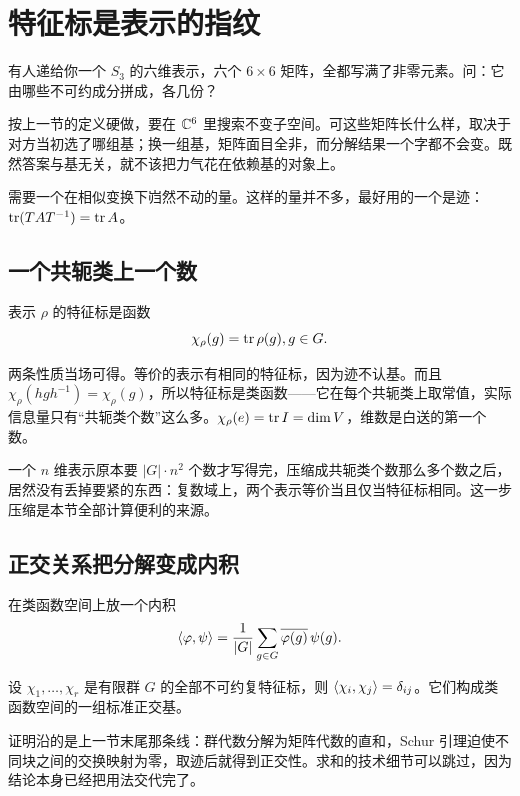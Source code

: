 \section{特征标是表示的指纹}
\label{sec:04-Discrete-Mathematics/09-Representation-Theory/03}

有人递给你一个 \(S_3\) 的六维表示，六个 \(6\times6\) 矩阵，全都写满了非零元素。问：它由哪些不可约成分拼成，各几份？

按上一节的定义硬做，要在 \(\mathbb{C}^6\) 里搜索不变子空间。可这些矩阵长什么样，取决于对方当初选了哪组基；换一组基，矩阵面目全非，而分解结果一个字都不会变。既然答案与基无关，就不该把力气花在依赖基的对象上。

需要一个在相似变换下岿然不动的量。这样的量并不多，最好用的一个是迹：\(\operatorname{tr}(TAT^{-1})=\operatorname{tr} A\)。

\subsection{一个共轭类上一个数}

\begin{definition}
表示 \(\rho\) 的特征标是函数
\[
\chi_\rho(g)=\operatorname{tr}\rho(g),\space g\in G.
\]
\end{definition}

两条性质当场可得。等价的表示有相同的特征标，因为迹不认基。而且 \(\chi_\rho(hgh^{-1})=\chi_\rho(g)\)，所以特征标是类函数——它在每个共轭类上取常值，实际信息量只有``共轭类个数''这么多。\(\chi_\rho(e)=\operatorname{tr} I=\dim V\)，维数是白送的第一个数。

一个 \(n\) 维表示原本要 \(|G|\cdot n^2\) 个数才写得完，压缩成共轭类个数那么多个数之后，居然没有丢掉要紧的东西：复数域上，两个表示等价当且仅当特征标相同。这一步压缩是本节全部计算便利的来源。

\subsection{正交关系把分解变成内积}

在类函数空间上放一个内积
\[
\left\langle\varphi,\psi\right\rangle=\frac1{|G|}\sum_{g\in G}\overline{\varphi(g)}\,\psi(g).
\]

\begin{theorem}[特征标正交关系]
设 \(\chi_1,\ldots,\chi_r\) 是有限群 \(G\) 的全部不可约复特征标，则 \(\left\langle\chi_i,\chi_j\right\rangle=\delta_{ij}\)。它们构成类函数空间的一组标准正交基。
\end{theorem}

证明沿的是上一节末尾那条线：群代数分解为矩阵代数的直和，Schur 引理迫使不同块之间的交换映射为零，取迹后就得到正交性。求和的技术细节可以跳过，因为结论本身已经把用法交代完了。

